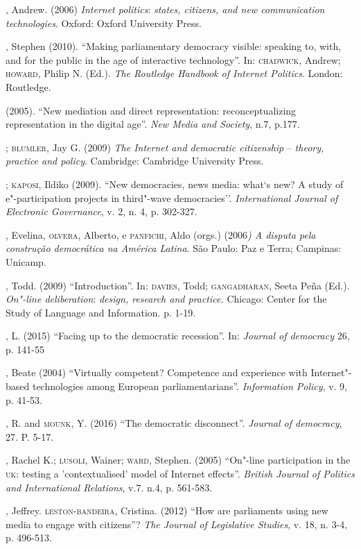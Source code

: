 \begin{bibliohedra}
, Andrew. (2006) \emph{Internet politics}: \emph{states,
citizens, and new communication technologies}. Oxford: Oxford University
Press.

, Stephen (2010). ``Making parliamentary democracy visible:
speaking to, with, and for the public in the age of interactive
technology''. In: \textsc{chadwick}, Andrew; \textsc{howard}, Philip N. (Ed.). \emph{The
Routledge Handbook of Internet Politics}. London: Routledge.

\titidem\mbox{} (2005). ``New mediation and direct representation:
reconceptualizing representation in the digital age''. \emph{New Media
and Society}, n.7, p.177.

\titidem; \textsc{blumler}, Jay G. (2009) \emph{The Internet and
democratic citizenship} -- \emph{theory, practice and policy}.
Cambridge: Cambridge University Press.

\titidem; \textsc{kaposi}, Ildiko (2009). ``New democracies, news media:
what`s new? A study of e"-participation projects in third"-wave
democracies''. \emph{International Journal of Electronic Governance}, v.
2, n. 4, p. 302-327.

, Evelina, \textsc{olvera}, Alberto, e \textsc{panfichi}, Aldo (orgs.) (2006\emph{)
A disputa pela construção democrática na América Latina}. São Paulo: Paz
e Terra; Campinas: Unicamp.

, Todd. (2009) ``Introduction''. In: \textsc{davies}, Todd; \textsc{gangadharan},
Seeta Peña (Ed.). \emph{On"-line deliberation}: \emph{design, research
and practice.} Chicago: Center for the Study of Language and
Information. p. 1-19.

, L. (2015) ``Facing up to the democratic recession''. In:
\emph{Journal of democracy} 26, p. 141-55

, Beate (2004) ``Virtually competent? Competence and experience
with Internet"-based technologies among European parliamentarians''.
\emph{Information Policy}, v. 9, p. 41-53.

, R. and \textsc{mounk}, Y. (2016) ``The democratic disconnect''.
\emph{Journal of democracy}, 27. P. 5-17.

, Rachel K.; \textsc{lusoli}, Wainer; \textsc{ward}, Stephen. (2005) ``On"-line
participation in the \textsc{uk}: testing a 'contextualised' model of Internet
effects''. \emph{British Journal of Politics and International
Relations}, v.7. n.4, p. 561-583.

, Jeffrey. \textsc{leston}-\textsc{bandeira}, Cristina. (2012) ``How are
parliaments using new media to engage with citizens''? \emph{The Journal
of Legislative Studies}, v. 18, n. 3-4, p. 496-513.


\end{bibliohedra}
